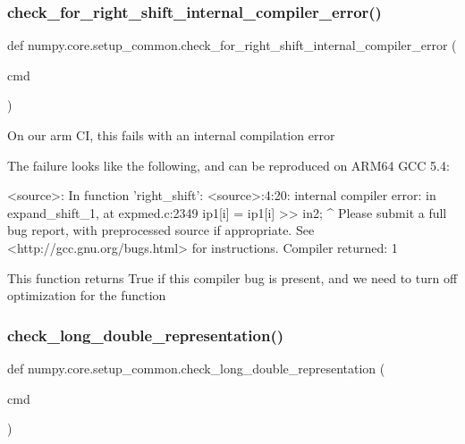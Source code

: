 \subsubsection{\texorpdfstring{check\+\_\+for\+\_\+right\+\_\+shift\+\_\+internal\+\_\+compiler\+\_\+error()}{check\_for\_right\_shift\_internal\_compiler\_error()}}
{\footnotesize\ttfamily def numpy.\+core.\+setup\+\_\+common.\+check\+\_\+for\+\_\+right\+\_\+shift\+\_\+internal\+\_\+compiler\+\_\+error (\begin{DoxyParamCaption}\item[{}]{cmd }\end{DoxyParamCaption})}

\begin{DoxyVerb}On our arm CI, this fails with an internal compilation error

The failure looks like the following, and can be reproduced on ARM64 GCC 5.4:

    <source>: In function 'right_shift':
    <source>:4:20: internal compiler error: in expand_shift_1, at expmed.c:2349
           ip1[i] = ip1[i] >> in2;
                  ^
    Please submit a full bug report,
    with preprocessed source if appropriate.
    See <http://gcc.gnu.org/bugs.html> for instructions.
    Compiler returned: 1

This function returns True if this compiler bug is present, and we need to
turn off optimization for the function
\end{DoxyVerb}
 \mbox{\label{namespacenumpy_1_1core_1_1setup__common_a7c0a830f73b42a1d7cb13d71defac25d}} 
\subsubsection{\texorpdfstring{check\+\_\+long\+\_\+double\+\_\+representation()}{check\_long\_double\_representation()}}
{\footnotesize\ttfamily def numpy.\+core.\+setup\+\_\+common.\+check\+\_\+long\+\_\+double\+\_\+representation (\begin{DoxyParamCaption}\item[{}]{cmd }\end{DoxyParamCaption})}

